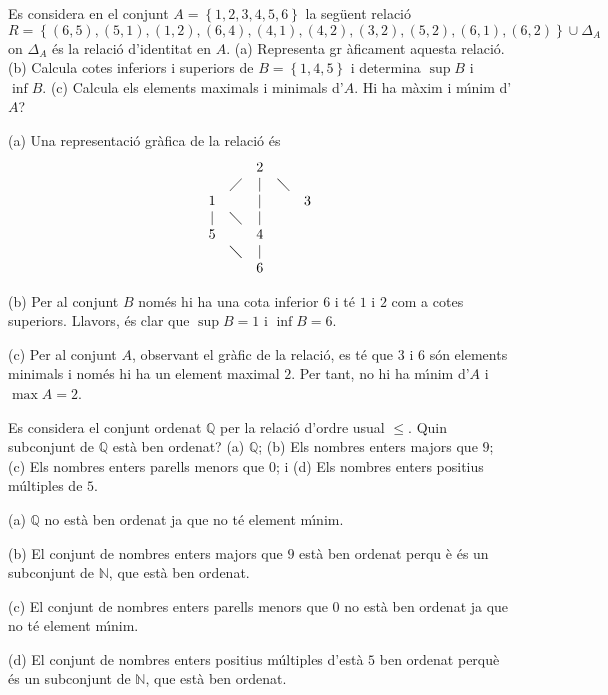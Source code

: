 \begin{exercici}
Es considera en el conjunt $A=\left\{ 1,2,3,4,5,6\right\} $ la seg\"{u}ent
relaci\'{o}
\begin{equation*}
R=\left\{
(6,5),(5,1),(1,2),(6,4),(4,1),(4,2),(3,2),(5,2),(6,1),(6,2)\right\} \cup
\Delta _{A}
\end{equation*}%
on $\Delta _{A}$ \'{e}s la relaci\'{o} d'identitat en $A$. (a) Representa gr%
\`{a}ficament aquesta relaci\'{o}. (b) Calcula cotes inferiors i superiors
de $B=\left\{ 1,4,5\right\} $ i determina $\sup B$ i $\inf B$. (c) Calcula
els elements maximals i minimals d'$A$. Hi ha m\`{a}xim i m\'{\i}nim d'$A$?
\end{exercici}

\begin{solucio}
(a) Una representaci\'{o} gr\`{a}fica de la relaci\'{o} \'{e}s%
\begin{equation*}
\begin{array}{ccccc}
&  & 2 &  &  \\
& \diagup & | & \diagdown &  \\
1 &  & | &  & 3 \\
| & \diagdown & | &  &  \\
5 &  & 4 &  &  \\
& \diagdown & | &  &  \\
&  & 6 &  &
\end{array}%
\end{equation*}

(b) Per al conjunt $B$ nom\'{e}s hi ha una cota inferior $6$ i t\'{e} $1$ i $%
2$ com a cotes superiors. Llavors, \'{e}s clar que $\sup B=1$ i $\inf B=6$.

(c) Per al conjunt $A$, observant el gr\`{a}fic de la relaci\'{o}, es t\'{e}
que $3$ i $6$ s\'{o}n elements minimals i nom\'{e}s hi ha un element maximal
$2$. Per tant, no hi ha m\'{\i}nim d'$A$ i $\max A=2$.
\end{solucio}

\begin{exercici}
Es considera el conjunt ordenat $\mathbb{Q}$ per la relaci\'{o} d'ordre
usual $\leq $. Quin subconjunt de $\mathbb{Q}$ est\`{a} ben ordenat? (a) $%
\mathbb{Q}$; (b) Els nombres enters majors que $9$; (c) Els nombres enters
parells menors que $0$; i (d) Els nombres enters positius m\'{u}ltiples de $%
5 $.
\end{exercici}

\begin{solucio}
(a) $\mathbb{Q}$ no est\`{a} ben ordenat ja que no t\'{e} element m\'{\i}nim.

(b) El conjunt de nombres enters majors que $9$ est\`{a} ben ordenat perqu%
\`{e} \'{e}s un subconjunt de $\mathbb{N}$, que est\`{a} ben ordenat.

(c) El conjunt de nombres enters parells menors que $0$ no est\`{a} ben
ordenat ja que no t\'{e} element m\'{\i}nim.

(d) El conjunt de nombres enters positius m\'{u}ltiples d'est\`{a} $5$ ben
ordenat perqu\`{e} \'{e}s un subconjunt de $\mathbb{N}$, que est\`{a} ben
ordenat.
\end{solucio}

